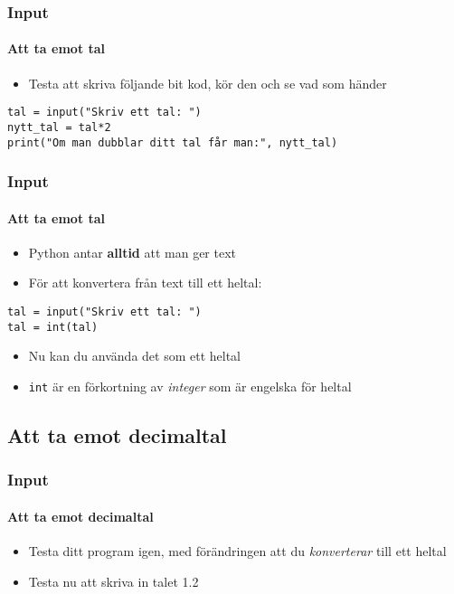 \documentclass[aspectratio=169]{beamer}
\begin{document}
\begin{frame}[fragile]
	\frametitle{Input}
	\framesubtitle{Att ta emot tal}
	
	\begin{itemize}
		\item Testa att skriva följande bit kod, kör den och se vad som händer
	\end{itemize}
	
	\begin{lstlisting}
tal = input("Skriv ett tal: ")
nytt_tal = tal*2
print("Om man dubblar ditt tal får man:", nytt_tal)
	\end{lstlisting}
	
\end{frame}

\begin{frame}[fragile]
	\frametitle{Input}
	\framesubtitle{Att ta emot tal}
	
	\begin{itemize}
		\item Python antar \textbf{alltid} att man ger text
		\item För att konvertera från text till ett heltal:
	\end{itemize}
	
	\begin{lstlisting}
tal = input("Skriv ett tal: ")
tal = int(tal)
	\end{lstlisting}
	
	\begin{itemize}
		\item Nu kan du använda det som ett heltal
		\item \texttt{int} är en förkortning av \textit{integer} som är engelska för heltal
	\end{itemize}
	
\end{frame}

\subsection{Att ta emot decimaltal}

\begin{frame}[fragile]
	\frametitle{Input}
	\framesubtitle{Att ta emot decimaltal}
	
	\begin{itemize}
		\item Testa ditt program igen, med förändringen att du \textit{konverterar} till ett heltal
		\item Testa nu att skriva in talet 1.2
	\end{itemize}
	
\end{frame}
\end{document}
